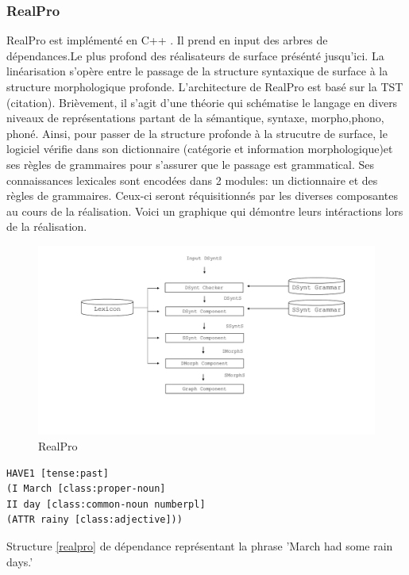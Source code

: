 \subsubsection{RealPro}
RealPro est implémenté en C++ \citep{LavoieFastPortableRealizer1997}. Il prend en input des arbres de dépendances.Le plus profond des réalisateurs de surface présénté jusqu'ici. La linéarisation s'opère entre le passage de la structure syntaxique de surface à la structure morphologique profonde. L'architecture de RealPro est basé sur la TST (citation). Brièvement, il s'agit d'une théorie qui schématise le langage en divers niveaux de représentations partant de la sémantique, syntaxe, morpho,phono, phoné. Ainsi, pour passer de la structure profonde à la strucutre de surface, le logiciel vérifie dans son dictionnaire (catégorie et information morphologique)et ses règles de grammaires pour s'assurer que le passage est grammatical. Ses connaissances lexicales sont encodées dans 2 modules: un dictionnaire et des règles de grammaires. Ceux-ci seront réquisitionnés par les diverses composantes au cours de la réalisation. Voici un graphique qui démontre leurs intéractions lors de la réalisation.
\begin{figure}[htb]
	\centering
	\includegraphics[width=1\textwidth, trim = {0cm 0cm 0cm 0cm},clip]{ch2/figs/realpro.pdf}
	\caption{RealPro}
	\label{fig:RealPro}
\end{figure}

\begin{lstlisting}[language=Xml, caption=Input, label=realpro]
HAVE1 [tense:past]
(I March [class:proper-noun]
II day [class:common-noun numberpl]
(ATTR rainy [class:adjective]))
\end{lstlisting}

Structure \ref{realpro} de dépendance représentant la phrase 'March had some rain days.'

